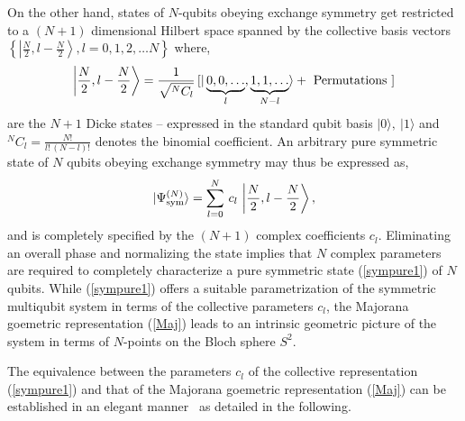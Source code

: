 \documentclass[pra,preprint,a4paper,superscriptaddress]{revtex4}
\begin{document}
{On the other hand, states of $N$-qubits obeying exchange symmetry get restricted to 
a $(N+1)$ dimensional Hilbert space spanned by the collective basis vectors $\left\{\left\vert \frac{N}{2}, l-\frac{N}{2}\right\rangle, l=0,1,2,
\ldots N \right\}$ where,    
\begin{equation}
\label{Dicke} 
\left\vert \frac{N}{2}, l-\frac{N}{2}\right\rangle =\frac{1}{\sqrt{^N C_l}}\,[\vert \underbrace{0, 0, \ldots}_{l}, 
\underbrace{1, 1, \ldots}_{N-l}\rangle +\ {\rm Permutations}\ ] 
\end{equation}
are the $N+1$ Dicke  states -- expressed in the standard qubit basis $\vert 0\rangle,\ \vert 1\rangle$ and  
 $^N C_l=\frac{N!}{l!\,(N-l)!}$ denotes the binomial coefficient.
An arbitrary pure symmetric state of $N$ qubits obeying exchange symmetry may thus be expressed as,    
\begin{equation}
\label{sympure1} 
\vert \Psi^{(N)}_{\rm sym}\rangle =\sum_{l=0}^{N}\, c_l\, \left\vert \frac{N}{2}, l-\frac{N}{2}\right\rangle,
\end{equation}
and is completely specified by the $(N+1)$ complex coefficients $c_l.$  Eliminating an overall phase and normalizing  the 
state  implies that $N$ complex parameters are required to 
completely characterize a pure symmetric state (\ref{sympure1}) of $N$ qubits. While (\ref{sympure1}) offers a suitable parametrization of the symmetric multiqubit system in terms of the collective parameters $c_l$, the Majorana goemetric representation (\ref{Maj}) leads to an intrinsic geometric picture of the  system in terms of $N$-points on the Bloch sphere $S^2$.  

The equivalence between the parameters $c_l$ of the collective representation (\ref{sympure1}) and that of  the Majorana goemetric representation (\ref{Maj}) can be established in an elegant manner~\cite{usa1,usa2,usa} as detailed in the following. 
\begin{enumerate}



\end{enumerate}}
\end{document}
